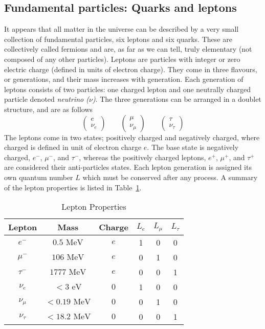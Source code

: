 \subsection{Fundamental particles: Quarks and leptons}
It appears that all matter in the universe can be described by a very small collection of fundamental particles, six leptons and six quarks. These are collectively called fermions and are, as far as we can tell, truly elementary (not composed of any other particles).
Leptons are particles with integer or zero electric charge (defined in units of electron charge). They come in three flavours, or generations, and their mass increases with generation. Each generation of leptons consists of two particles: one charged lepton and one neutrally charged particle denoted \emph{neutrino ($\nu$)}. The three generations can be arranged in a doublet structure, and are as follows
\begin{equation}
\label{eqn:lepton_flavor_doublets}
\begin{pmatrix} e       \\ \nu_e      \end{pmatrix} \qquad
\begin{pmatrix} \mu     \\ \nu_{\mu}  \end{pmatrix} \qquad
\begin{pmatrix} \tau    \\ \nu_{\tau} \end{pmatrix}
\end{equation}
The leptons come in two states; positively charged and negatively charged, where charged is defined in unit of electron charge $e$. The base state is negatively charged, $e^{-}$, $\mu^{-}$, and $\tau^{-}$,  whereas the positively charged leptons,  $e^{+}$, $\mu^{+}$, and $\tau^{+}$ are considered their anti-particles states.
Each lepton generation is assigned its own quantum number $L$ which must be conserved after any process. A summary of the lepton properties is listed in Table~\ref{table:theory:lepprop}.
\begin{table}[h!]
\begin{center}
\begin{tabular}{|c|c|c| c c c|}
\hline
Lepton        & Mass           & Charge & $L_{e}$ & $L_{\mu}$ & $L_{\tau}$ \\
\hline
$e^{-}$      & $0.5 \mbox{ MeV}$   & $e$ & 1       & 0         & 0 \\
$\mu^{-}$    & $106 \mbox{ MeV}$   & $e$ & 0       & 1         & 0 \\
$\tau^{-}$   & $1777 \mbox{ MeV}$  & $e$ & 0       & 0         & 1 \\
\hline
$\nu_{e}$    & $< 3 \mbox{ eV}$       & $0$    & 1       & 0         & 0 \\
$\nu_{\mu}$  & $< 0.19 \mbox{ MeV}$   & $0$    & 0       & 1         & 0 \\
$\nu_{\tau}$ & $< 18.2 \mbox{ MeV}$   & $0$    & 0       & 0         & 1 \\
\hline
\end{tabular}
\end{center}
\caption{Lepton Properties}
\label{table:theory:lepprop}
\end{table}
